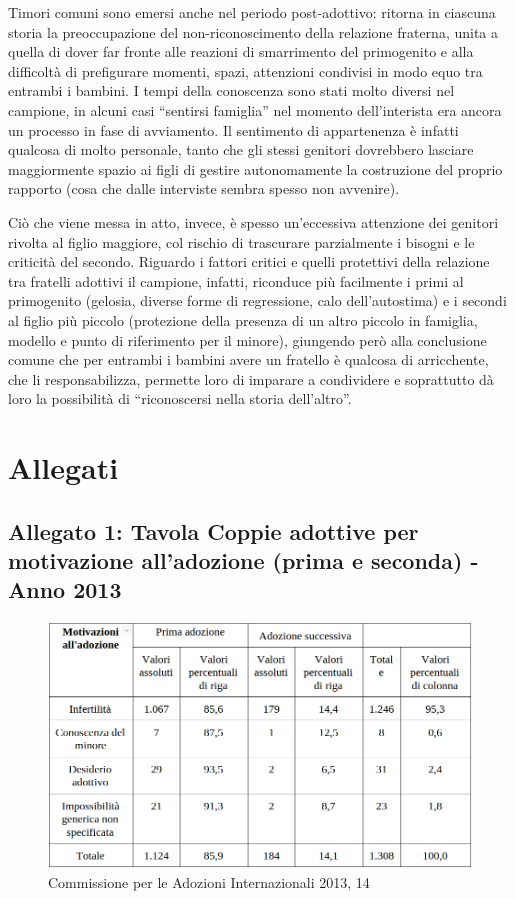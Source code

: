 \documentclass[12pt,oneside,svgnames]{memoir}
\begin{document}
Timori comuni sono emersi anche nel periodo post-adottivo: ritorna in
ciascuna storia la preoccupazione del non-riconoscimento della relazione
fraterna, unita a quella di dover far fronte alle reazioni di
smarrimento del primogenito e alla difficoltà di prefigurare momenti,
spazi, attenzioni condivisi in modo equo tra entrambi i bambini. I tempi
della conoscenza sono stati molto diversi nel campione, in alcuni casi
``sentirsi famiglia'' nel momento dell'interista era ancora un processo
in fase di avviamento. Il sentimento di appartenenza è infatti qualcosa
di molto personale, tanto che gli stessi genitori dovrebbero lasciare
maggiormente spazio ai figli di gestire autonomamente la costruzione del
proprio rapporto (cosa che dalle interviste sembra spesso non avvenire).

Ciò che viene messa in atto, invece, è spesso un'eccessiva attenzione
dei genitori rivolta al figlio maggiore, col rischio di trascurare
parzialmente i bisogni e le criticità del secondo. Riguardo i fattori
critici e quelli protettivi della relazione tra fratelli adottivi il
campione, infatti, riconduce più facilmente i primi al primogenito
(gelosia, diverse forme di regressione, calo dell'autostima) e i secondi
al figlio più piccolo (protezione della presenza di un altro piccolo in
famiglia, modello e punto di riferimento per il minore), giungendo però
alla conclusione comune che per entrambi i bambini avere un fratello è
qualcosa di arricchente, che li responsabilizza, permette loro di
imparare a condividere e soprattutto dà loro la possibilità di
``riconoscersi nella storia dell'altro''.

\chapter{Allegati}\label{allegati}

\section{Allegato 1: Tavola Coppie adottive per motivazione all'adozione
(prima e seconda) - Anno
2013}\label{allegato-1-tavola-coppie-adottive-per-motivazione-alladozione-prima-e-seconda---anno-2013}

\begin{figure}[htbp]
\centering
\includegraphics{./src/img/tavolacoppieadottive.png}
\caption{Commissione per le Adozioni Internazionali 2013, 14}
\end{figure}
\end{document}
